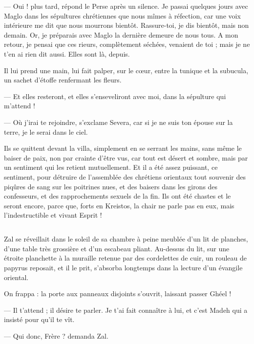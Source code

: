 \documentclass[a4paper, 11pt, oneside, polutonikogreek, french]{article}
\begin{document}
--- Oui ! plus tard, répond le Perse après un silence. Je passai quelques jours avec Maglo dans les sépultures chrétiennes que nous mîmes à réfection, car une voix intérieure me dit que nous mourrons bientôt. Rassure-toi, je dis bientôt, mais non demain. Or, je préparais avec Maglo la dernière demeure de nous tous. A mon retour, je pensai que ces rieurs, complètement séchées, venaient de toi ; mais je ne t'en ai rien dit aussi. Elles sont là, depuis.

Il lui prend une main, lui fait palper, sur le cœur, entre la tunique et la subucula, un sachet d'étoffe renfermant les fleurs.

--- Et elles resteront, et elles s'enseveliront avec moi, dans la sépulture qui m'attend !

--- Où j'irai te rejoindre, s'exclame Severa, car si je ne suis ton épouse sur la terre, je le serai dans le ciel.

Ils se quittent devant la villa, simplement en se serrant les mains, sans même le baiser de paix, non par crainte d'être vus, car tout est désert et sombre, mais par un sentiment qui les retient mutuellement. Et il a été assez puissant, ce sentiment, pour détruire de l'assemblée des chrétiens orientaux tout souvenir des piqûres de sang sur les poitrines nues, et des baisers dans les girons des confesseurs, et des rapprochements sexuels de la fin. Ils ont été chastes et le seront encore, parce que, forts en Kreistos, la chair ne parle pas en eux, mais l'indestructible et vivant Esprit !
\clearpage
\subsection{}
\paragraph{}
Zal se réveillait dans le soleil de sa chambre à peine meublée d'un lit de planches, d'une table très grossière et d'un escabeau pliant. Au-dessus du lit, sur une étroite planchette à la muraille retenue par des cordelettes de cuir, un rouleau de papyrus reposait, et il le prit, s'absorba longtemps dans la lecture d'un évangile oriental.

On frappa : la porte aux panneaux disjoints s'ouvrit, laissant passer Ghéel !

--- Il t'attend ; il désire te parler. Je t'ai fait connaître à lui, et c'est Madeh qui a insisté pour qu'il te vît.

--- Qui donc, Frère ? demanda Zal.
\end{document}
